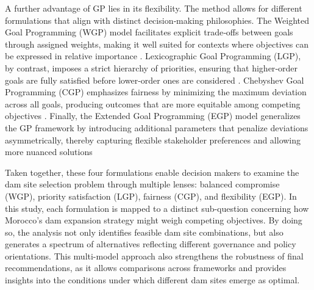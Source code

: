 A further advantage of GP lies in its flexibility. The method allows for different formulations that align with distinct decision‑making philosophies. The Weighted Goal Programming (WGP) model facilitates explicit trade‑offs between goals through assigned weights, making it well suited for contexts where objectives can be expressed in relative importance \cite{JONES2011}. Lexicographic Goal Programming (LGP), by contrast, imposes a strict hierarchy of priorities, ensuring that higher‑order goals are fully satisfied before lower‑order ones are considered \cite{jones2010}. Chebyshev Goal Programming (CGP) emphasizes fairness by minimizing the maximum deviation across all goals, producing outcomes that are more equitable among competing objectives \cite{JONES2011}. Finally, the Extended Goal Programming (EGP) model generalizes the GP framework by introducing additional parameters that penalize deviations asymmetrically, thereby capturing flexible stakeholder preferences and allowing more nuanced solutions \cite{jones2010}

Taken together, these four formulations enable decision makers to examine the dam site selection problem through multiple lenses: balanced compromise (WGP), priority satisfaction (LGP), fairness (CGP), and flexibility (EGP). In this study, each formulation is mapped to a distinct sub-question concerning how Morocco’s dam expansion strategy might weigh competing objectives. By doing so, the analysis not only identifies feasible dam site combinations, but also generates a spectrum of alternatives reflecting different governance and policy orientations. This multi-model approach also strengthens the robustness of final recommendations, as it allows comparisons across frameworks and provides insights into the conditions under which different dam sites emerge as optimal.

